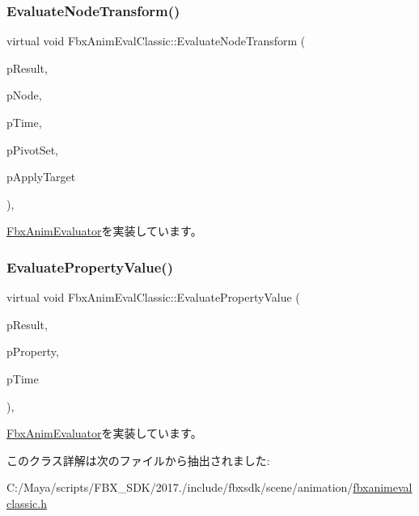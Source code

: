 \subsubsection{\texorpdfstring{Evaluate\+Node\+Transform()}{EvaluateNodeTransform()}}
{\footnotesize\ttfamily virtual void Fbx\+Anim\+Eval\+Classic\+::\+Evaluate\+Node\+Transform (\begin{DoxyParamCaption}\item[{\hyperlink{class_fbx_node_eval_state}{Fbx\+Node\+Eval\+State} $\ast$}]{p\+Result,  }\item[{\hyperlink{class_fbx_node}{Fbx\+Node} $\ast$}]{p\+Node,  }\item[{const \hyperlink{class_fbx_time}{Fbx\+Time} \&}]{p\+Time,  }\item[{\hyperlink{class_fbx_node_ae62b7311ac4727654cdf1ebd5cbf7343}{Fbx\+Node\+::\+E\+Pivot\+Set}}]{p\+Pivot\+Set,  }\item[{bool}]{p\+Apply\+Target }\end{DoxyParamCaption})\hspace{0.3cm}{\ttfamily [protected]}, {\ttfamily [virtual]}}



\hyperlink{class_fbx_anim_evaluator_a6de6ef5ab77169192cd39baf76f14037}{Fbx\+Anim\+Evaluator}を実装しています。

\mbox{\label{class_fbx_anim_eval_classic_a3618b50c5fd35f18f5e6f873ca07cf2e}} 
\subsubsection{\texorpdfstring{Evaluate\+Property\+Value()}{EvaluatePropertyValue()}}
{\footnotesize\ttfamily virtual void Fbx\+Anim\+Eval\+Classic\+::\+Evaluate\+Property\+Value (\begin{DoxyParamCaption}\item[{\hyperlink{class_fbx_property_eval_state}{Fbx\+Property\+Eval\+State} $\ast$}]{p\+Result,  }\item[{\hyperlink{class_fbx_property}{Fbx\+Property} \&}]{p\+Property,  }\item[{const \hyperlink{class_fbx_time}{Fbx\+Time} \&}]{p\+Time }\end{DoxyParamCaption})\hspace{0.3cm}{\ttfamily [protected]}, {\ttfamily [virtual]}}



\hyperlink{class_fbx_anim_evaluator_aa29759ee76b1cbb0ced4fee1508d5d84}{Fbx\+Anim\+Evaluator}を実装しています。



このクラス詳解は次のファイルから抽出されました\+:\begin{DoxyCompactItemize}
\item 
C\+:/\+Maya/scripts/\+F\+B\+X\+\_\+\+S\+D\+K/2017./include/fbxsdk/scene/animation/\hyperlink{fbxanimevalclassic_8h}{fbxanimevalclassic.\+h}\end{DoxyCompactItemize}
